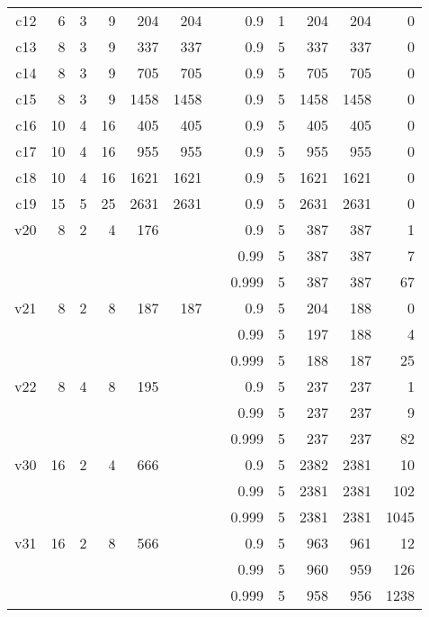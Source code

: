 \documentclass[a4paper,11pt]{article}
\begin{document}
\begin{table}
\begin{tabular}{@{\bfseries}rrrrrrrrrrrr}
	c12  &  6 &  3 &  9 &  204 &  204 &&    0.9 & 1 &  204 &  204 &    0 \\
	c13  &  8 &  3 &  9 &  337 &  337 &&    0.9 & 5 &  337 &  337 &    0 \\
	c14  &  8 &  3 &  9 &  705 &  705 &&    0.9 & 5 &  705 &  705 &    0 \\
	c15  &  8 &  3 &  9 & 1458 & 1458 &&    0.9 & 5 & 1458 & 1458 &    0 \\
	c16  & 10 &  4 & 16 &  405 &  405 &&    0.9 & 5 &  405 &  405 &    0 \\
	c17  & 10 &  4 & 16 &  955 &  955 &&    0.9 & 5 &  955 &  955 &    0 \\
	c18  & 10 &  4 & 16 & 1621 & 1621 &&    0.9 & 5 & 1621 & 1621 &    0 \\
	c19  & 15 &  5 & 25 & 2631 & 2631 &&    0.9 & 5 & 2631 & 2631 &    0 \\[2ex]
	v20  &  8 &  2 &  4 &  176 &      &&    0.9 & 5 &  387 &  387 &    1 \\
	     &    &    &    &      &      &&   0.99 & 5 &  387 &  387 &    7 \\
	     &    &    &    &      &      &&  0.999 & 5 &  387 &  387 &   67 \\
	v21  &  8 &  2 &  8 &  187 &  187 &&    0.9 & 5 &  204 &  188 &    0 \\
	     &    &    &    &      &      &&   0.99 & 5 &  197 &  188 &    4 \\
	     &    &    &    &      &      &&  0.999 & 5 &  188 &  187 &   25 \\
	v22  &  8 &  4 &  8 &  195 &      &&    0.9 & 5 &  237 &  237 &    1 \\
	     &    &    &    &      &      &&   0.99 & 5 &  237 &  237 &    9 \\
	     &    &    &    &      &      &&  0.999 & 5 &  237 &  237 &   82 \\
	v30  & 16 &  2 &  4 &  666 &      &&    0.9 & 5 & 2382 & 2381 &   10 \\
	     &    &    &    &      &      &&   0.99 & 5 & 2381 & 2381 &  102 \\
	     &    &    &    &      &      &&  0.999 & 5 & 2381 & 2381 & 1045 \\
	v31  & 16 &  2 &  8 &  566 &      &&    0.9 & 5 &  963 &  961 &   12 \\
	     &    &    &    &      &      &&   0.99 & 5 &  960 &  959 &  126 \\
	     &    &    &    &      &      &&  0.999 & 5 &  958 &  956 & 1238 \\

\end{tabular}
\end{table}
\end{document}
